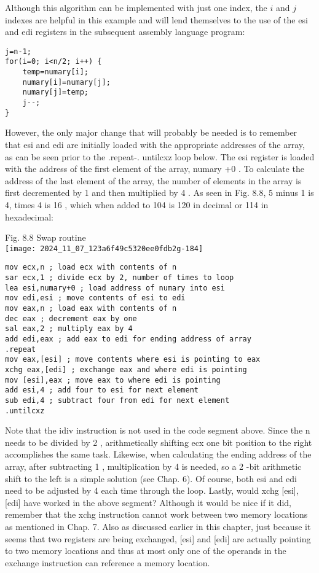 \documentclass[10pt]{article}
\begin{document}
Although this algorithm can be implemented with just one index, the $i$ and $j$ indexes are helpful in this example and will lend themselves to the use of the esi and edi registers in the subsequent assembly language program:

\begin{verbatim}
j=n-1;
for(i=0; i<n/2; i++) {
    temp=numary[i];
    numary[i]=numary[j];
    numary[j]=temp;
    j--;
}
\end{verbatim}

However, the only major change that will probably be needed is to remember that esi and edi are initially loaded with the appropriate addresses of the array, as can be seen prior to the .repeat-. untilcxz loop below. The esi register is loaded with the address of the first element of the array, numary +0 . To calculate the address of the last element of the array, the number of elements in the array is first decremented by 1 and then multiplied by 4 . As seen in Fig. 8.8, 5 minus 1 is 4, times 4 is 16 , which when added to 104 is 120 in decimal or 114 in hexadecimal:

Fig. 8.8 Swap routine\\
\texttt{[image: 2024\_11\_07\_123a6f49c5320ee0fdb2g-184]}

\begin{verbatim}
mov ecx,n ; load ecx with contents of n
sar ecx,1 ; divide ecx by 2, number of times to loop
lea esi,numary+0 ; load address of numary into esi
mov edi,esi ; move contents of esi to edi
mov eax,n ; load eax with contents of n
dec eax ; decrement eax by one
sal eax,2 ; multiply eax by 4
add edi,eax ; add eax to edi for ending address of array
.repeat
mov eax,[esi] ; move contents where esi is pointing to eax
xchg eax,[edi] ; exchange eax and where edi is pointing
mov [esi],eax ; move eax to where edi is pointing
add esi,4 ; add four to esi for next element
sub edi,4 ; subtract four from edi for next element
.untilcxz
\end{verbatim}

Note that the idiv instruction is not used in the code segment above. Since the n needs to be divided by 2 , arithmetically shifting ecx one bit position to the right accomplishes the same task. Likewise, when calculating the ending address of the array, after subtracting 1 , multiplication by 4 is needed, so a 2 -bit arithmetic shift to the left is a simple solution (see Chap. 6). Of course, both esi and edi need to be adjusted by 4 each time through the loop. Lastly, would xchg [esi], [edi] have worked in the above segment? Although it would be nice if it did, remember that the xchg instruction cannot work between two memory locations as mentioned in Chap. 7. Also as discussed earlier in this chapter, just because it seems that two registers are being exchanged, [esi] and [edi] are actually pointing to two memory locations and thus at most only one of the operands in the exchange instruction can reference a memory location.
\end{document}
